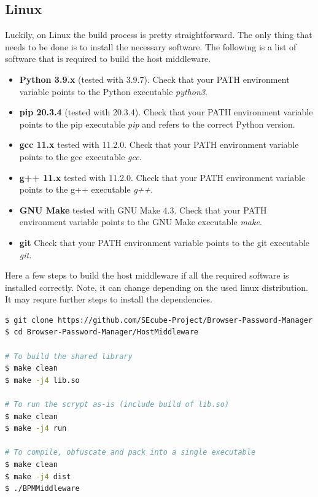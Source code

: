 \subsection{Linux}
Luckily, on Linux the build process is pretty straightforward. The only thing that needs to be done is to install the necessary software. The following is a list of software that is required to build the host middleware.

\begin{itemize}
	\item \textbf{Python 3.9.x} (tested with 3.9.7). Check that your PATH environment variable points to the Python executable \textit{python3}.
	\item \textbf{pip 20.3.4} (tested with 20.3.4). Check that your PATH environment variable points to the pip executable \textit{pip} and refers to the correct Python version.
	\item \textbf{gcc 11.x} {tested with 11.2.0}. Check that your PATH environment variable points to the gcc executable \textit{gcc}.
	\item \textbf{g++ 11.x} {tested with 11.2.0}. Check that your PATH environment variable points to the g++ executable \textit{g++}.
	\item \textbf{GNU Make} {tested with GNU Make 4.3}. Check that your PATH environment variable points to the GNU Make executable \textit{make}.
	\item \textbf{git} Check that your PATH environment variable points to the git executable \textit{git}.
\end{itemize}

Here a few steps to build the host middleware if all the required software is installed correctly. Note, it can change depending on the used linux distribution. It may requre further steps to install the dependencies.

\begin{lstlisting}[language=bash,caption={bash version}]
$ git clone https://github.com/SEcube-Project/Browser-Password-Manager.git
$ cd Browser-Password-Manager/HostMiddleware

# To build the shared library
$ make clean
$ make -j4 lib.so

# To run the scrypt as-is (include build of lib.so)
$ make clean
$ make -j4 run

# To compile, obfuscate and pack into a single executable
$ make clean
$ make -j4 dist
$ ./BPMMiddleware

\end{lstlisting}


